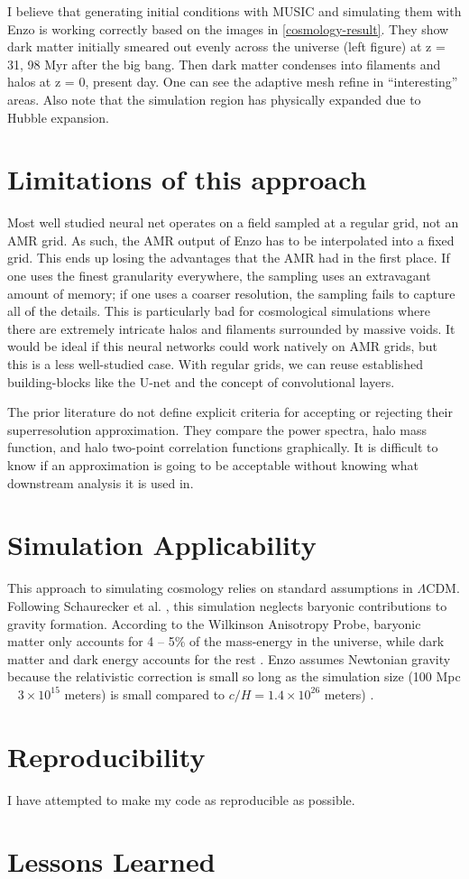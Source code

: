 I believe that generating initial conditions with MUSIC \cite{hahn_multi-scale_2011} and simulating them with Enzo \cite{collins_cosmological_2010,bryan_enzo_2014} is working correctly based on the images in \cref{cosmology-result}. They show dark matter initially smeared out evenly across the universe (left figure) at z = 31, 98 Myr after the big bang. Then dark matter condenses into filaments and halos at z = 0, present day. One can see the adaptive mesh refine in ``interesting'' areas. Also note that the simulation region has physically expanded due to Hubble expansion.


\section{Limitations of this approach}

Most well studied neural net operates on a field sampled at a regular grid, not an AMR grid. As such, the AMR output of Enzo has to be interpolated into a fixed grid. This ends up losing the advantages that the AMR had in the first place. If one uses the finest granularity everywhere, the sampling uses an extravagant amount of memory; if one uses a coarser resolution, the sampling fails to capture all of the details. This is particularly bad for cosmological simulations where there are extremely intricate halos and filaments surrounded by massive voids. It would be ideal if this neural networks could work natively on AMR grids, but this is a less well-studied case. With regular grids, we can reuse established building-blocks like the U-net and the concept of convolutional layers.

The prior literature \cite{schaurecker_super-resolving_2021,li_ai-assisted_2021} do not define explicit criteria for accepting or rejecting their superresolution approximation. They compare the power spectra, halo mass function, and halo two-point correlation functions graphically. It is difficult to know if an approximation is going to be acceptable without knowing what downstream analysis it is used in.

\section{Simulation Applicability}

This approach to simulating cosmology relies on standard assumptions in \(\Lambda\)CDM. Following Schaurecker et al. \cite{schaurecker_super-resolving_2021}, this simulation neglects baryonic contributions to gravity formation. According to the Wilkinson Anisotropy Probe, baryonic matter only accounts for 4 -- 5\% of the mass-energy in the universe, while dark matter and dark energy accounts for the rest \cite{hinshaw_nine-year_2013}. Enzo assumes Newtonian gravity because the relativistic correction is small so long as the simulation size (100 Mpc ~ \(3 \times 10^{15}\) meters) is small compared to \(c / H = 1.4 \times 10^{26}\) meters) \cite{bryan_enzo_2014}.

\section{Reproducibility}

I have attempted to make my code as reproducible as possible.

\section{Lessons Learned}

